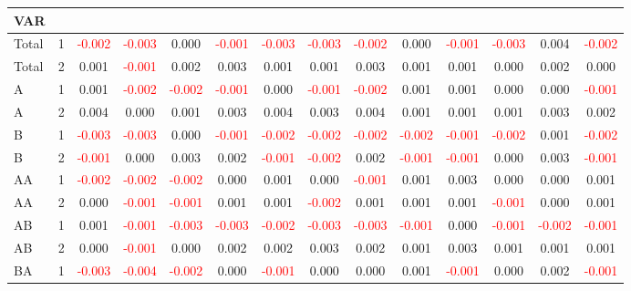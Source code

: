 \begin{table}[H]
{\begin{tabular}{llcccccccccccc}
\hline
VAR &  &  &  &  &  &  &  &  &  &  &  &  & \\
\hline
Total & 1 & \textcolor{red}{-0.002} & \textcolor{red}{-0.003} & 0.000 & \textcolor{red}{-0.001} & \textcolor{red}{-0.003} & \textcolor{red}{-0.003} & \textcolor{red}{-0.002} & 0.000 & \textcolor{red}{-0.001} & \textcolor{red}{-0.003} & 0.004 & \textcolor{red}{-0.002}\\
Total & 2 & 0.001 & \textcolor{red}{-0.001} & 0.002 & 0.003 & 0.001 & 0.001 & 0.003 & 0.001 & 0.001 & 0.000 & 0.002 & 0.000\\
A & 1 & 0.001 & \textcolor{red}{-0.002} & \textcolor{red}{-0.002} & \textcolor{red}{-0.001} & 0.000 & \textcolor{red}{-0.001} & \textcolor{red}{-0.002} & 0.001 & 0.001 & 0.000 & 0.000 & \textcolor{red}{-0.001}\\
A & 2 & 0.004 & 0.000 & 0.001 & 0.003 & 0.004 & 0.003 & 0.004 & 0.001 & 0.001 & 0.001 & 0.003 & 0.002\\
B & 1 & \textcolor{red}{-0.003} & \textcolor{red}{-0.003} & 0.000 & \textcolor{red}{-0.001} & \textcolor{red}{-0.002} & \textcolor{red}{-0.002} & \textcolor{red}{-0.002} & \textcolor{red}{-0.002} & \textcolor{red}{-0.001} & \textcolor{red}{-0.002} & 0.001 & \textcolor{red}{-0.002}\\
B & 2 & \textcolor{red}{-0.001} & 0.000 & 0.003 & 0.002 & \textcolor{red}{-0.001} & \textcolor{red}{-0.002} & 0.002 & \textcolor{red}{-0.001} & \textcolor{red}{-0.001} & 0.000 & 0.003 & \textcolor{red}{-0.001}\\
AA & 1 & \textcolor{red}{-0.002} & \textcolor{red}{-0.002} & \textcolor{red}{-0.002} & 0.000 & 0.001 & 0.000 & \textcolor{red}{-0.001} & 0.001 & 0.003 & 0.000 & 0.000 & 0.001\\
AA & 2 & 0.000 & \textcolor{red}{-0.001} & \textcolor{red}{-0.001} & 0.001 & 0.001 & \textcolor{red}{-0.002} & 0.001 & 0.001 & 0.001 & \textcolor{red}{-0.001} & 0.000 & 0.001\\
AB & 1 & 0.001 & \textcolor{red}{-0.001} & \textcolor{red}{-0.003} & \textcolor{red}{-0.003} & \textcolor{red}{-0.002} & \textcolor{red}{-0.003} & \textcolor{red}{-0.003} & \textcolor{red}{-0.001} & 0.000 & \textcolor{red}{-0.001} & \textcolor{red}{-0.002} & \textcolor{red}{-0.001}\\
AB & 2 & 0.000 & \textcolor{red}{-0.001} & 0.000 & 0.002 & 0.002 & 0.003 & 0.002 & 0.001 & 0.003 & 0.001 & 0.001 & 0.001\\
BA & 1 & \textcolor{red}{-0.003} & \textcolor{red}{-0.004} & \textcolor{red}{-0.002} & 0.000 & \textcolor{red}{-0.001} & 0.000 & 0.000 & 0.001 & \textcolor{red}{-0.001} & 0.000 & 0.002 & \textcolor{red}{-0.001}\\

\end{tabular}}
\end{table}
